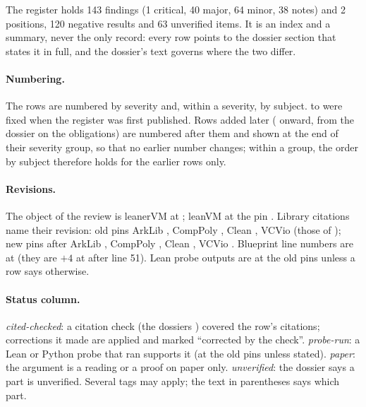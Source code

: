 \label{sec:reg}

The register holds 143 findings (1 critical, 40 major, 64 minor, 38 notes) and 2 positions, 120 negative results and 63 unverified items. It is an index and a summary, never the only record: every row points to the dossier section that states it in full, and the dossier's text governs where the two differ.

\paragraph{Numbering.} The rows are numbered by severity and, within a severity, by subject.  to  were fixed when the register was first published. Rows added later ( onward, from the dossier on the obligations) are numbered after them and shown at the end of their severity group, so that no earlier number changes; within a group, the order by subject therefore holds for the earlier rows only.

\paragraph{Revisions.} The object of the review is leanerVM  at ; leanVM at the pin . Library citations name their revision: old pins ArkLib , CompPoly , Clean , VCVio  (those of ); new pins after  ArkLib , CompPoly , Clean , VCVio . Blueprint line numbers are at  (they are $+4$ at  after line 51). Lean probe outputs are at the old pins unless a row says otherwise.

\paragraph{Status column.} \emph{cited-checked}: a citation check (the dossiers ) covered the row's citations; corrections it made are applied and marked \enquote{corrected by the check}. \emph{probe-run}: a Lean or Python probe that ran supports it (at the old pins unless stated). \emph{paper}: the argument is a reading or a proof on paper only. \emph{unverified}: the dossier says a part is unverified. Several tags may apply; the text in parentheses says which part.

